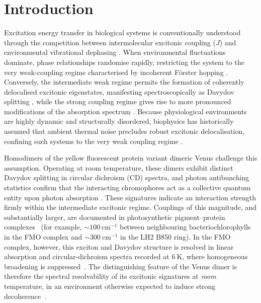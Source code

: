\documentclass[journal=jpcbfk, manuscript=article, layout=twocolumn, doi=true]{achemso}
\begin{document}
\section{Introduction}
Excitation energy transfer in biological systems is conventionally understood through the competition between intermolecular excitonic coupling ($J$) and environmental vibrational dephasing \cite{forster1965delocalized, may2004charge}. When environmental fluctuations dominate, phase relationships randomise rapidly, restricting the system to the very weak-coupling regime characterised by incoherent Förster hopping \cite{forster1948intermolecular}. Conversely, the intermediate weak regime permits the formation of coherently delocalised excitonic eigenstates, manifesting spectroscopically as Davydov splitting \cite{davydov1971}, while the strong coupling regime gives rise to more pronounced modifications of the absorption spectrum \cite{clegg2006history}. Because physiological environments are highly dynamic and structurally disordered, biophysics has historically assumed that ambient thermal noise precludes robust excitonic delocalisation, confining such systems to the very weak coupling regime \cite{clegg2006history, nelson2018role}.

Homodimers of the yellow fluorescent protein variant dimeric Venus challenge this assumption. Operating at room temperature, these dimers exhibit distinct Davydov splitting in circular dichroism (CD) spectra, and photon antibunching statistics confirm that the interacting chromophores act as a collective quantum entity upon photon absorption \cite{kim2019venusa206, freed2025effect}. These signatures indicate an interaction strength firmly within the intermediate excitonic regime. Couplings of this magnitude, and substantially larger, are documented in photosynthetic pigment--protein complexes~\cite{van2000photosynthetic, adolphs2006proteins, krueger1998} (for example, ${\sim}100~\mathrm{cm^{-1}}$ between neighbouring bacteriochlorophylls in the FMO complex and ${\sim}300~\mathrm{cm^{-1}}$ in the LH2 B850 ring). In the FMO complex, however, this exciton and Davydov structure is resolved in linear absorption and circular-dichroism spectra recorded at $6~\mathrm{K}$, where homogeneous broadening is suppressed~\cite{adolphs2006proteins}. The distinguishing feature of the Venus dimer is therefore the spectral resolvability of its excitonic signatures at \emph{room} temperature, in an environment otherwise expected to induce strong decoherence~\cite{ishizaki2009unified}.
\end{document}
